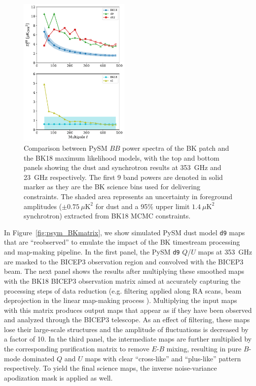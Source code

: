 \documentclass[twocolumn]{aastex631}
\begin{document}
\begin{figure}
    \centering
    \includegraphics[width=0.48\textwidth]{figures/BKfield_power.pdf}
    \caption{Comparison between PySM $BB$ power spectra of the BK patch and the BK18 maximum likelihood models, with the top and bottom panels showing the dust and synchrotron results at 353~GHz and 23~GHz respectively. The first 9 band powers are denoted in solid marker as they are the BK science bins used for delivering constraints. The shaded area represents an uncertainty in foreground amplitudes ($\pm 0.75~\mu\text{K}^2$ for dust and a 95\% upper limit $1.4~\mu\text{K}^2$ synchrotron) extracted from BK18 MCMC constraints.}
    \label{fig:BKfield_power}
\end{figure}

In Figure~\ref{fig:psym_BKmatrix}, we show simulated PySM dust model \texttt{d9} maps that are ``reobserved'' to emulate the impact of the BK timestream processing and map-making pipeline. In the first panel, the PySM \texttt{d9} $Q$/$U$ maps at 353~GHz are masked to the BICEP3 observation region and convolved with the BICEP3 beam. The next panel shows the results after multiplying these smoothed maps with the BK18 BICEP3 observation matrix aimed at accurately capturing  the processing steps of data reduction (e.g. filtering applied along RA scans,  beam deprojection in the linear map-making process \citep{BICEP2Collaboration:2016}). Multiplying the input maps with this matrix produces output maps that appear as if they have been observed and analyzed through the BICEP3 telescope. As an effect of filtering, these maps lose their large-scale structures and the amplitude of fluctuations is decreased by a factor of 10. In the third panel, the intermediate maps are further multiplied by the corresponding purification matrix to remove $E$-$B$ mixing, resulting in pure $B$-mode dominated $Q$ and $U$ maps with clear ``cross-like'' and ``plus-like'' pattern respectively. To yield the final science maps, the inverse noise-variance apodization mask is applied as well.
\end{document}
